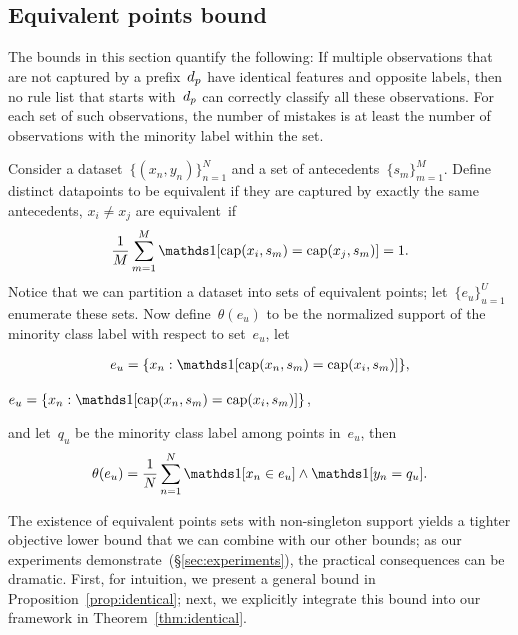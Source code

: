 

\subsection{Equivalent points bound}
\label{sec:identical}

The bounds in this section quantify the following:
%
If multiple observations that are not captured by a prefix~$d_p$
have identical features and opposite labels, then no rule list that
starts with~$d_p$ can correctly classify all these observations.
%
For each set of such observations, the number of mistakes is at least
the number of observations with the minority label within the set.

Consider a dataset~${\{(x_n, y_n)\}_{n=1}^N}$ and a set of antecedents~${\{s_m\}_{m=1}^M}$.
%
Define distinct datapoints to be equivalent if they are captured by
exactly the same antecedents, \ie $x_i \neq x_j$ are equivalent~if
\begin{align}
\frac{1}{M} \sum_{m=1}^M \one [ \Cap(x_i, s_m) = \Cap(x_j, s_m) ] = 1.
\end{align}
Notice that we can partition a dataset into sets of equivalent points;
let~${\{e_u\}_{u=1}^U}$ enumerate these sets.
%
Now define~$\theta(e_u)$ to be the normalized support of the minority
class label with respect to set~$e_u$, \eg let
\begin{arxiv}
\begin{align}
{e_u = \{x_n : \one [ \Cap(x_n, s_m) = \Cap(x_i, s_m) ] \}},
\end{align}
\end{arxiv}
\begin{kdd}
${e_u = \{x_n : \one [ \Cap(x_n, s_m) = \Cap(x_i, s_m) ] \}}$,
\end{kdd}
and let~$q_u$ be the minority class label among points in~$e_u$, then
\begin{align}
\theta(e_u) = \frac{1}{N} \sum_{n=1}^N \one [ x_n \in e_u ] \wedge \one [ y_n = q_u ].
\end{align}

The existence of equivalent points sets with non-singleton support
yields a tighter objective lower bound that we can combine with our other bounds;
as our experiments demonstrate~(\S\ref{sec:experiments}),
the practical consequences can be dramatic.
%
First, for intuition, we present a general bound in
Proposition~\ref{prop:identical}; next, we explicitly integrate
this bound into our framework in Theorem~\ref{thm:identical}.

